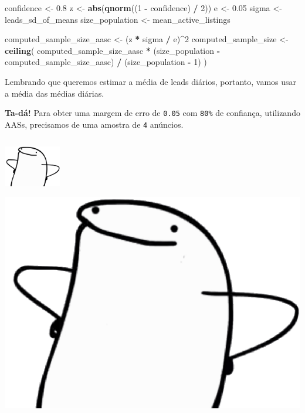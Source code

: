 \documentclass[
]{article}
\newenvironment{Shaded}{\begin{snugshade}}{\end{snugshade}}
\newcommand{\DecValTok}[1]{\textcolor[rgb]{0.00,0.00,0.81}{#1}}
\newcommand{\FloatTok}[1]{\textcolor[rgb]{0.00,0.00,0.81}{#1}}
\newcommand{\FunctionTok}[1]{\textcolor[rgb]{0.13,0.29,0.53}{\textbf{#1}}}
\newcommand{\NormalTok}[1]{#1}
\newcommand{\OtherTok}[1]{\textcolor[rgb]{0.56,0.35,0.01}{#1}}
\newcommand{\SpecialCharTok}[1]{\textcolor[rgb]{0.81,0.36,0.00}{\textbf{#1}}}
\let\oldincludegraphics\includegraphics
\renewcommand{\includegraphics}[2][]{ \ifthenelse{ \equal{#1}{} } { \oldincludegraphics[width=2.5cm,height=2.5cm,keepaspectratio=true]{#2} } { \oldincludegraphics[#1]{#2} } }
\begin{document}
\begin{Shaded}
\begin{Highlighting}[]
\NormalTok{confidence }\OtherTok{\textless{}{-}} \FloatTok{0.8}
\NormalTok{z }\OtherTok{\textless{}{-}} \FunctionTok{abs}\NormalTok{(}\FunctionTok{qnorm}\NormalTok{((}\DecValTok{1} \SpecialCharTok{{-}}\NormalTok{ confidence) }\SpecialCharTok{/} \DecValTok{2}\NormalTok{))}
\NormalTok{e }\OtherTok{\textless{}{-}} \FloatTok{0.05}
\NormalTok{sigma }\OtherTok{\textless{}{-}}\NormalTok{ leads\_sd\_of\_means}
\NormalTok{size\_population }\OtherTok{\textless{}{-}}\NormalTok{ mean\_active\_listings}

\NormalTok{computed\_sample\_size\_aasc }\OtherTok{\textless{}{-}}\NormalTok{ (z }\SpecialCharTok{*}\NormalTok{ sigma }\SpecialCharTok{/}\NormalTok{ e)}\SpecialCharTok{\^{}}\DecValTok{2}
\NormalTok{computed\_sample\_size }\OtherTok{\textless{}{-}} \FunctionTok{ceiling}\NormalTok{(}
\NormalTok{  computed\_sample\_size\_aasc }\SpecialCharTok{*}
\NormalTok{    (size\_population }\SpecialCharTok{{-}}\NormalTok{ computed\_sample\_size\_aasc) }\SpecialCharTok{/}\NormalTok{ (size\_population }\SpecialCharTok{{-}} \DecValTok{1}\NormalTok{)}
\NormalTok{)}
\end{Highlighting}
\end{Shaded}

Lembrando que queremos estimar a média de leads diários, portanto, vamos
usar a média das médias diárias.

\textbf{Ta-dá!} Para obter uma margem de erro de \texttt{0.05} com
\texttt{80\%} de confiança, utilizando AASs, precisamos de uma amostra
de \texttt{4} anúncios.

\includegraphics{./images/flork-orgulhoso.png}
\end{document}
